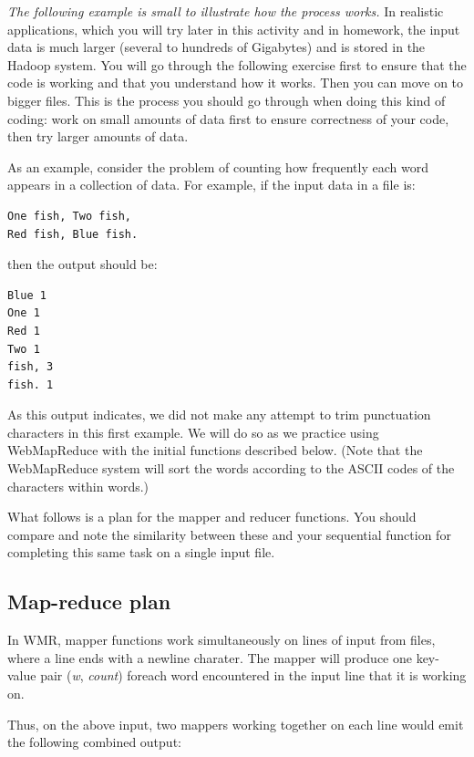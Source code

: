 \documentclass[letterpaper,10pt,openany,oneside]{sphinxmanual}
\begin{document}
\emph{The following example is small to illustrate how the process works.}
In realistic applications, which you will try later in this
activity and in homework, the input data is much larger (several to
hundreds of Gigabytes) and is stored in the Hadoop system. You will
go through the following exercise first to ensure that the code is
working and that you understand how it works. Then you can move on
to bigger files. This is the process you should go through when
doing this kind of coding: work on small amounts of data first to
ensure correctness of your code, then try larger amounts of data.

As an example, consider the problem of counting how frequently each
word appears in a collection of data. For example, if the input
data in a file is:

\begin{Verbatim}[commandchars=\\\{\}]
One fish, Two fish,
Red fish, Blue fish.
\end{Verbatim}

then the output should be:

\begin{Verbatim}[commandchars=\\\{\}]
Blue 1
One 1
Red 1
Two 1
fish, 3
fish. 1
\end{Verbatim}

As this output indicates, we did not make any attempt to trim
punctuation characters in this first example. We will do so as we
practice using WebMapReduce with the initial functions described
below. (Note that the WebMapReduce system will sort the words
according to the ASCII codes of the characters within words.)

What follows is a plan for the mapper and reducer functions. You
should compare and note the similarity between these and your
sequential function for completing this same task on a single input
file.


\subsection{Map-reduce plan}
\label{wmr_py/wmr_py:map-reduce-plan}
In WMR, mapper functions work simultaneously on lines of input from
files, where a line ends with a newline charater. The mapper will
produce one key-value pair (\emph{w}, \emph{count}) foreach word encountered
in the input line that it is working on.

Thus, on the above input, two mappers working together on each line
would emit the following combined output:
\end{document}
